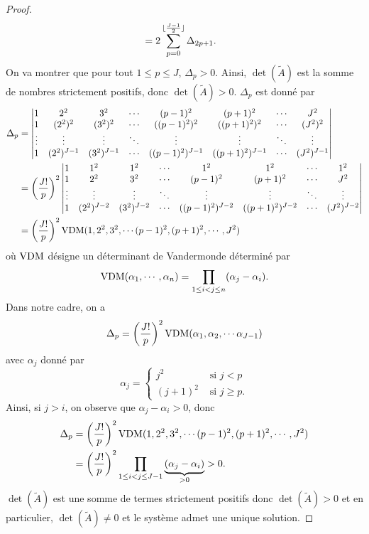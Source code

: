 \begin{proof}
\begin{align*}
& = 2 \displaystyle\sum\limits_{p=0}^{\lfloor \frac{J-1}{2} \rfloor} \Delta_{2p+1}.
\end{align*}
On va montrer que pour tout $1 \leq p \leq J$, $\Delta_p >0$. Ainsi, $\det(\tilde{A})$ est la somme de nombres strictement positifs, donc $\det(\tilde{A})>0$. $\Delta_p$ est donné par
\begin{align*}
\Delta_p & = \begin{vmatrix}
1 & 2^2 & 3^2 & \cdots & (p-1)^2 & (p+1)^2 & \cdots & J^2 \\ 
1 & (2^2)^2 & (3^2)^2 & \cdots & ((p-1)^2)^2 & ((p+1)^2)^{2} & \cdots & (J^2)^2 \\ 
\vdots & \vdots & \vdots & \ddots & \vdots & \vdots & \ddots & \vdots \\ 
1 & (2^2)^{J-1} & (3^2)^{J-1} & \cdots & ((p-1)^2)^{J-1} & ((p+1)^2)^{J-1} & \cdots & (J^2)^{J-1}
\end{vmatrix} \\
& = \left( \dfrac{J!}{p} \right)^2 \begin{vmatrix}
1 & 1^2 & 1^2 & \cdots & 1^2 & 1^2 & \cdots & 1^2 \\ 
1 & 2^2 & 3^2 & \cdots & (p-1)^2 & (p+1)^{2} & \cdots & J^2 \\ 
\vdots & \vdots & \vdots & \ddots & \vdots & \vdots & \ddots & \vdots \\ 
1 & (2^2)^{J-2} & (3^2)^{J-2} & \cdots & ((p-1)^2)^{J-2} & ((p+1)^2)^{J-2} & \cdots & (J^2)^{J-2}
\end{vmatrix} \\
& = \left( \dfrac{J!}{p} \right)^2 \text{VDM}(1, 2^2, 3^2, \cdots (p-1)^2, (p+1)^2, \cdots, J^2)
\end{align*}
où $\text{VDM}$ désigne un déterminant de Vandermonde \cite{Evans1976} déterminé par 
\begin{equation}
\text{VDM}(\alpha_1, \cdots, \alpha_n) = \displaystyle\prod\limits_{1\leq i < j \leq n} (\alpha_j - \alpha_i).
\end{equation}
Dans notre cadre, on a
\begin{equation}
\Delta_p = \left( \dfrac{J!}{p} \right)^2 \text{VDM}(\alpha_1, \alpha_2, \cdots \alpha_{J-1})
\end{equation}
avec $\alpha_j$ donné par
\begin{equation}
\alpha_j = \left\lbrace
\begin{array}{cl}
j^2 & \text{ si } j<p \\
(j+1)^2 & \text{ si } j \geq p.
\end{array}
\right.
\end{equation}
Ainsi, si $j>i$, on observe que $\alpha_j - \alpha_i>0$, donc
\begin{align*}
\Delta_p & = \left( \dfrac{J!}{p} \right)^2 \text{VDM}(1, 2^2, 3^2, \cdots (p-1)^2, (p+1)^2, \cdots, J^2) \\
	& = \left( \dfrac{J!}{p} \right)^2  \displaystyle\prod\limits_{1\leq i < j \leq J-1} \underbrace{(\alpha_j - \alpha_i)}_{>0} >0.
\end{align*}
$\det(\tilde{A})$ est une somme de termes strictement positifs donc $\det(\tilde{A})>0$ et en particulier, $\det(\tilde{A}) \neq 0$ et le système admet une unique solution.
\end{proof}

